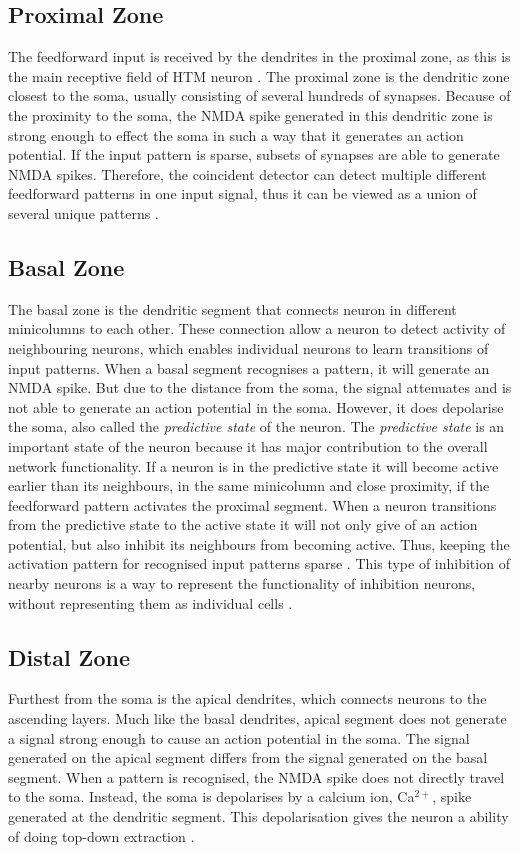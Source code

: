 \subsection{Proximal Zone}
The feedforward input is received by the dendrites in the proximal zone, as this is the main receptive field of HTM neuron \cite{10.3389/fncir.2016.00023}. The proximal zone is the dendritic zone closest to the soma, usually consisting of several hundreds of synapses. Because of the proximity to the soma, the NMDA spike generated in this dendritic zone is strong enough to effect the soma in such a way that it generates an action potential. If the input pattern is sparse, subsets of synapses are able to generate NMDA spikes. Therefore, the coincident detector can detect multiple different feedforward patterns in one input signal, thus it can be viewed as a union of several unique patterns \cite{10.3389/fncir.2016.00023}.


\subsection{Basal Zone}
The basal zone is the dendritic segment that connects neuron in different minicolumns to each other. These connection allow a neuron to detect activity of neighbouring neurons, which enables individual neurons to learn transitions of input patterns. When a basal segment recognises a pattern, it will generate an NMDA spike. But due to the distance from the soma, the signal attenuates and is not able to generate an action potential in the soma. However, it does depolarise the soma, also called the \textit{predictive state} of the neuron. The \textit{predictive state} is an important state of the neuron because it has major contribution to the overall network functionality. If a neuron is in the predictive state it will become active earlier than its neighbours, in the same minicolumn and close proximity, if the feedforward pattern activates the proximal segment. When a neuron transitions from the predictive state to the active state it will not only give of an action potential, but also inhibit its neighbours from becoming active. Thus, keeping the activation pattern for recognised input patterns sparse \cite{10.3389/fncir.2016.00023}. This type of inhibition of nearby neurons is a way to represent the functionality of inhibition neurons, without representing them as individual cells \cite{10.3389/fncir.2017.00081}.


\subsection{Distal Zone}
Furthest from the soma is the apical dendrites, which connects neurons to the ascending layers. Much like the basal dendrites, apical segment does not generate a signal strong enough to cause an action potential in the soma. The signal generated on the apical segment differs from the signal generated on the basal segment. When a pattern is recognised, the NMDA spike does not directly travel to the soma. Instead, the soma is depolarises by a calcium ion, Ca$^{2+}$, spike generated at the dendritic segment. This depolarisation gives the neuron a ability of doing top-down extraction \cite{10.3389/fncir.2016.00023}.


